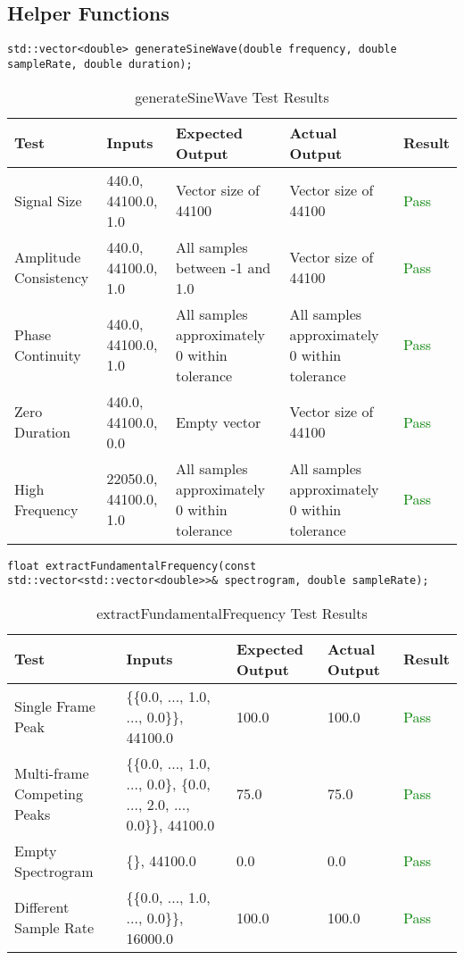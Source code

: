 \documentclass[12pt, titlepage]{article}
\begin{document}
\subsection{Helper Functions}

\texttt{std::vector<double> generateSineWave(double frequency, double sampleRate, double duration);}
\begin{longtable}{|L{3cm}|L{2cm}|L{2cm}|L{2cm}|l|}
  \caption{generateSineWave Test Results} \\
  \hline
  \textbf{Test} & \textbf{Inputs} & \textbf{Expected Output} & \textbf{Actual Output} & \textbf{Result} \\
  \hline
  Signal Size & 440.0, 44100.0, 1.0 & Vector size of 44100 & Vector size of 44100 & \textcolor{green}{Pass} \\
  \hline
  Amplitude Consistency & 440.0, 44100.0, 1.0 & All samples between -1 and 1.0 & Vector size of 44100 & \textcolor{green}{Pass} \\
  \hline
  Phase Continuity & 440.0, 44100.0, 1.0 & All samples approximately 0 within tolerance & All samples approximately 0 within tolerance & \textcolor{green}{Pass} \\
  \hline
  Zero Duration & 440.0, 44100.0, 0.0 & Empty vector & Vector size of 44100 & \textcolor{green}{Pass} \\
  \hline
  High Frequency & 22050.0, 44100.0, 1.0 & All samples approximately 0 within tolerance & All samples approximately 0 within tolerance & \textcolor{green}{Pass} \\
  \hline
\end{longtable}


\noindent\texttt{float extractFundamentalFrequency(const std::vector<std::vector<double>>\& spectrogram, double sampleRate);}

\begin{longtable}{|L{3cm}|L{2cm}|L{2cm}|L{2cm}|l|}
  \caption{extractFundamentalFrequency Test Results} \\
  \hline
  \textbf{Test} & \textbf{Inputs} & \textbf{Expected Output} & \textbf{Actual Output} & \textbf{Result} \\
  \hline
  Single Frame Peak & \{\{0.0, ..., 1.0, ..., 0.0\}\}, 44100.0 & 100.0 & 100.0 & \textcolor{green}{Pass} \\
  \hline
  Multi-frame Competing Peaks & \{\{0.0, ..., 1.0, ..., 0.0\}, \{0.0, ..., 2.0, ..., 0.0\}\}, 44100.0 & 75.0 & 75.0 & \textcolor{green}{Pass} \\
  \hline
  Empty Spectrogram & \{\}, 44100.0 & 0.0 & 0.0 & \textcolor{green}{Pass} \\
  \hline
  Different Sample Rate & \{\{0.0, ..., 1.0, ..., 0.0\}\}, 16000.0 & 100.0 & 100.0 & \textcolor{green}{Pass} \\
  \hline
\end{longtable}
\end{document}
